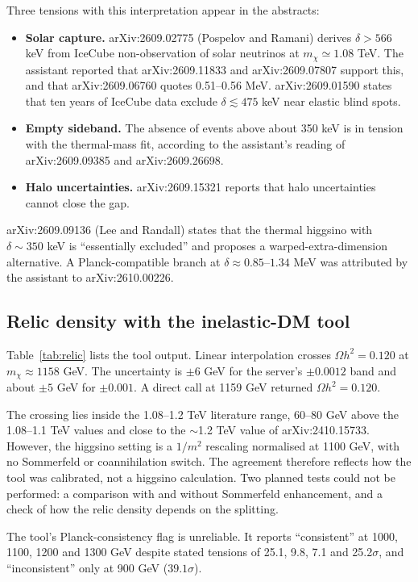\documentclass[11pt,a4paper]{article}
\begin{document}
Three tensions with this interpretation appear in the abstracts:
\begin{itemize}
\item \textbf{Solar capture.} arXiv:2609.02775 (Pospelov and Ramani) derives $\delta > 566$ keV from IceCube non-observation of solar neutrinos at $m_\chi \simeq 1.08$ TeV. The assistant reported that arXiv:2609.11833 and arXiv:2609.07807 support this, and that arXiv:2609.06760 quotes 0.51--0.56 MeV. arXiv:2609.01590 states that ten years of IceCube data exclude $\delta \lesssim 475$ keV near elastic blind spots.
\item \textbf{Empty sideband.} The absence of events above about 350 keV is in tension with the thermal-mass fit, according to the assistant's reading of arXiv:2609.09385 and arXiv:2609.26698.
\item \textbf{Halo uncertainties.} arXiv:2609.15321 reports that halo uncertainties cannot close the gap.
\end{itemize}
arXiv:2609.09136 (Lee and Randall) states that the thermal higgsino with $\delta\sim350$ keV is ``essentially excluded'' and proposes a warped-extra-dimension alternative. A Planck-compatible branch at $\delta \approx 0.85$--$1.34$ MeV was attributed by the assistant to arXiv:2610.00226.

\subsection{Relic density with the inelastic-DM tool}
Table~\ref{tab:relic} lists the tool output. Linear interpolation crosses $\Omega h^2 = 0.120$ at $m_\chi \approx 1158$ GeV. The uncertainty is $\pm6$ GeV for the server's $\pm0.0012$ band and about $\pm5$ GeV for $\pm0.001$. A direct call at 1159 GeV returned $\Omega h^2 = 0.120$.

The crossing lies inside the 1.08--1.2 TeV literature range, 60--80 GeV above the 1.08--1.1 TeV values and close to the $\sim$1.2 TeV value of arXiv:2410.15733. However, the higgsino setting is a $1/m^2$ rescaling normalised at 1100 GeV, with no Sommerfeld or coannihilation switch. The agreement therefore reflects how the tool was calibrated, not a higgsino calculation. Two planned tests could not be performed: a comparison with and without Sommerfeld enhancement, and a check of how the relic density depends on the splitting.

The tool's Planck-consistency flag is unreliable. It reports ``consistent'' at 1000, 1100, 1200 and 1300 GeV despite stated tensions of 25.1, 9.8, 7.1 and 25.2$\sigma$, and ``inconsistent'' only at 900 GeV ($39.1\sigma$).
\end{document}
